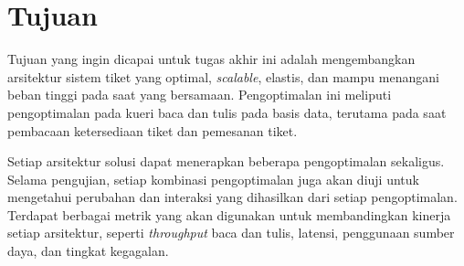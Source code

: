 \section{Tujuan}

Tujuan yang ingin dicapai untuk tugas akhir ini adalah mengembangkan arsitektur sistem tiket yang optimal, \textit{scalable}, elastis, dan mampu menangani beban tinggi pada saat yang bersamaan. Pengoptimalan ini meliputi pengoptimalan pada kueri baca dan tulis pada basis data, terutama pada saat pembacaan ketersediaan tiket dan pemesanan tiket.

Setiap arsitektur solusi dapat menerapkan beberapa pengoptimalan sekaligus. Selama pengujian, setiap kombinasi pengoptimalan juga akan diuji untuk mengetahui perubahan dan interaksi yang dihasilkan dari setiap pengoptimalan. Terdapat berbagai metrik yang akan digunakan untuk membandingkan kinerja setiap arsitektur, seperti \textit{throughput} baca dan tulis, latensi, penggunaan sumber daya, dan tingkat kegagalan.
